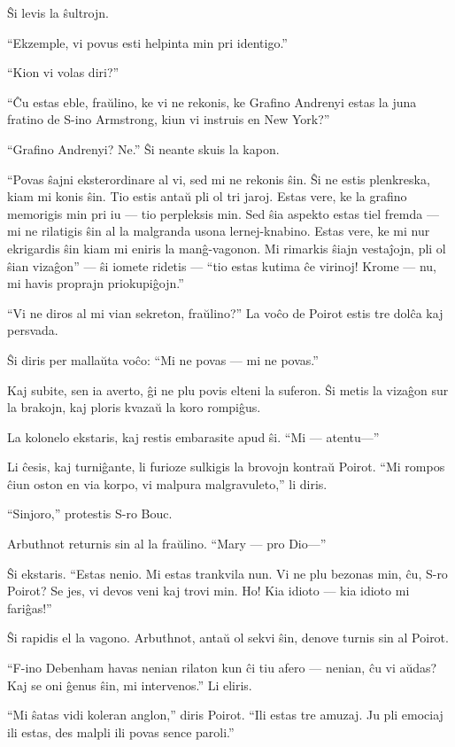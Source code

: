 Ŝi levis la ŝultrojn.

``Ekzemple, vi povus esti helpinta min pri identigo.''

``Kion vi volas diri?''

``Ĉu estas eble, fraŭlino, ke vi ne rekonis, ke Grafino Andrenyi estas la juna fratino de S-ino Armstrong, kiun vi instruis en New York?''

``Grafino Andrenyi? Ne.'' Ŝi neante skuis la kapon.

``Povas ŝajni eksterordinare al vi, sed mi ne rekonis ŝin. Ŝi ne estis plenkreska, kiam mi konis ŝin. Tio estis antaŭ pli ol tri jaroj. Estas vere, ke la grafino memorigis min pri iu --- tio perpleksis min. Sed ŝia aspekto estas tiel fremda --- mi ne rilatigis ŝin al la malgranda usona lernej-knabino. Estas vere, ke mi nur ekrigardis ŝin kiam mi eniris la manĝ-vagonon. Mi rimarkis ŝiajn vestaĵojn, pli ol ŝian vizaĝon'' --- ŝi iomete ridetis --- ``tio estas kutima ĉe virinoj! Krome --- nu, mi havis proprajn priokupiĝojn.''

``Vi ne diros al mi vian sekreton, fraŭlino?'' La voĉo de Poirot estis tre dolĉa kaj persvada.

Ŝi diris per mallaŭta voĉo: ``Mi ne povas --- mi ne povas.''

Kaj subite, sen ia averto, ĝi ne plu povis elteni la suferon. Ŝi metis la vizaĝon sur la brakojn, kaj ploris kvazaŭ la koro rompiĝus.

La kolonelo ekstaris, kaj restis embarasite apud ŝi. ``Mi --- atentu---''

Li ĉesis, kaj turniĝante, li furioze sulkigis la brovojn kontraŭ Poirot. ``Mi rompos ĉiun oston en via korpo, vi malpura malgravuleto,'' li diris.

``Sinjoro,'' protestis S-ro Bouc.

Arbuthnot returnis sin al la fraŭlino. ``Mary --- pro Dio---''

Ŝi ekstaris. ``Estas nenio. Mi estas trankvila nun. Vi ne plu bezonas min, ĉu, S-ro Poirot? Se jes, vi devos veni kaj trovi min. Ho! Kia idioto --- kia idioto mi fariĝas!''

Ŝi rapidis el la vagono. Arbuthnot, antaŭ ol sekvi ŝin, denove turnis sin al Poirot.

``F-ino Debenham havas nenian rilaton kun ĉi tiu afero --- nenian, ĉu vi aŭdas? Kaj se oni ĝenus ŝin, mi intervenos.'' Li eliris.

``Mi ŝatas vidi koleran anglon,'' diris Poirot. ``Ili estas tre amuzaj. Ju pli emociaj ili estas, des malpli ili povas sence paroli.''


